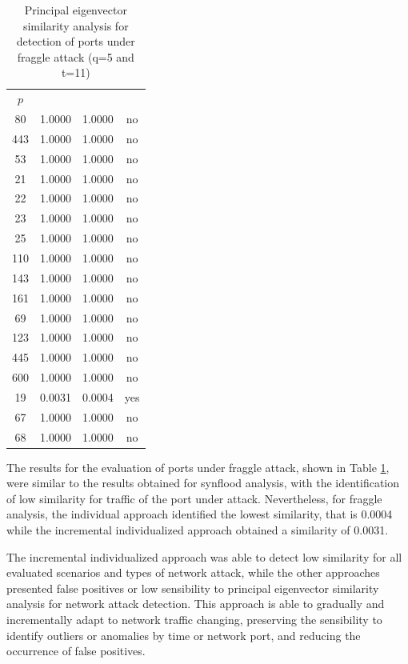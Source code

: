 \begin{table}[h!]
  \centering
  \footnotesize
  \caption{Principal eigenvector similarity analysis for detection of ports under fraggle attack (q=5 and t=11)}
  \label{tab:2.10}
  \begin{tabular}{ c c c c }
	\toprule
	\multirow{2}{*}{\pmb{Port} $p$}   &\multicolumn{2}{c}{\pmb{Approaches}} &\multirow{2}{*}{\pmb{Ground Truth}}\\ 
			\hhline{~--~}
			&\pmb{Incremental Individualized} &\pmb{Individual}\\
	\midrule
	80 &1.0000 &1.0000 &no \\
	443 &1.0000 &1.0000 &no \\
	53 &1.0000 &1.0000 &no \\
	21 &1.0000 &1.0000 &no \\
	22 &1.0000 &1.0000 &no \\
	23 &1.0000 &1.0000 &no \\
	25 &1.0000 &1.0000 &no \\
	110 &1.0000 &1.0000 &no \\
	143 &1.0000 &1.0000 &no \\
	161 &1.0000 &1.0000 &no \\
	69 &1.0000 &1.0000 &no \\
	123 &1.0000 &1.0000 &no \\
	445 &1.0000 &1.0000 &no \\
	600 &1.0000 &1.0000 &no \\
	19 &0.0031 &0.0004 &yes \\
	67 &1.0000 &1.0000 &no \\
	68 &1.0000 &1.0000 &no \\
    \bottomrule
  \end{tabular}
\end{table}

The results for the evaluation of ports under fraggle attack, shown in Table \ref{tab:2.10}, were similar to the results obtained for synflood analysis, with the identification of low similarity for traffic of the port under attack. Nevertheless, for fraggle analysis, the individual approach identified the lowest similarity, that is 0.0004 while the incremental individualized approach obtained a similarity of 0.0031.

The incremental individualized approach was able to detect low similarity for all evaluated scenarios and types of network attack, while the other approaches presented false positives or low sensibility to principal eigenvector similarity analysis for network attack detection. This approach is able to gradually and incrementally adapt to network traffic changing, preserving the sensibility to identify outliers or anomalies by time or network port, and reducing the occurrence of false positives.

